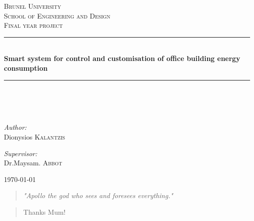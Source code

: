 \documentclass[12pt,a4paper]{report}
\author{Student: Dionisios Kalantzis (SID:0733139) \\ Supervisor: Dr. Maysam Abbod}
\begin{document}
\onehalfspacing
\begin{titlepage}
\begin{center}
%
\textsc{\LARGE Brunel University}\\[1.5cm]
\textsc{\LARGE School of Engineering and Design}\\[1cm]
%
\textsc{\Large Final year project}\\[1cm]
\hrule
\hfill\\[0.5cm]
{ \huge \bfseries Smart system for control and customisation of office building energy consumption}\\[0.5cm]
\hrule
\hfill\\[0.5cm]
\ \\
\hfill\\[0.2cm]
\begin{minipage}{0.4\textwidth}
\begin{flushleft} \large
\emph{Author:}\\
Dionysios \textsc{Kalantzis}
\end{flushleft}
\end{minipage}
\begin{minipage}{0.4\textwidth}
\begin{flushright} \large
\emph{Supervisor:} \\
Dr.Maysam. \textsc{Abbot}
\end{flushright}
\end{minipage}
\vfill
{\large \today}
\end{center}
\end{titlepage}
\newpage
%
\newpage
\begin{abstract}
\emph{"Apollo the god who sees and foresees everything."}
\end{abstract}
%
\renewcommand{\abstractname}{Acknowledgements}
\begin{abstract}
 Thanks Mum!
\end{abstract}
%
\newpage
\tableofcontents
\newpage
\listoffigures
%
\pagestyle{fancyplain}
\fancyhf{}
\lhead{\fancyplain{}{\leftmark}}
\rhead{\fancyplain{}{}}
\rfoot{\fancyplain{}{\thepage}}
%
\end{document}
